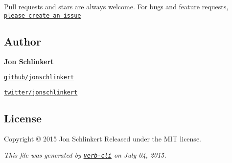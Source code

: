 Pull requests and stars are always welcome. For bugs and feature requests, \href{https://github.com/jonschlinkert/is-extendable/issues/new}{\tt please create an issue}

\subsection*{Author}

{\bfseries Jon Schlinkert}


\begin{DoxyItemize}
\item \href{https://github.com/jonschlinkert}{\tt github/jonschlinkert}
\item \href{http://twitter.com/jonschlinkert}{\tt twitter/jonschlinkert}
\end{DoxyItemize}

\subsection*{License}

Copyright © 2015 Jon Schlinkert Released under the M\+IT license.





{\itshape This file was generated by \href{https://github.com/assemble/verb-cli}{\tt verb-\/cli} on July 04, 2015.} 